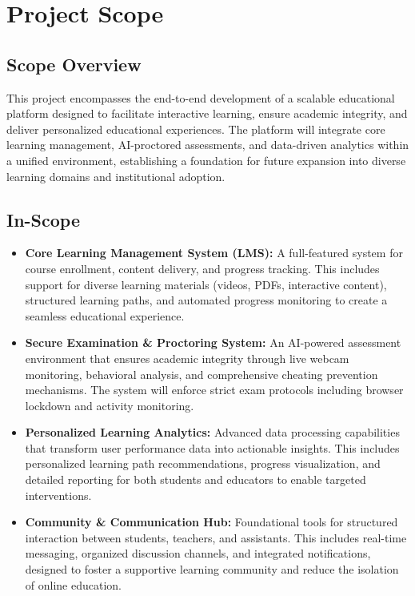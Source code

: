 \section{Project Scope}
\label{sec:project_scope}

\subsection{Scope Overview}
\label{subsec:scope_overview}
This project encompasses the end-to-end development of a scalable educational platform designed to facilitate interactive learning, ensure academic integrity, and deliver personalized educational experiences. The platform will integrate core learning management, AI-proctored assessments, and data-driven analytics within a unified environment, establishing a foundation for future expansion into diverse learning domains and institutional adoption.

\subsection{In-Scope}
\label{subsec:in_scope}
\begin{itemize}
    \item \textbf{Core Learning Management System (LMS):} A full-featured system for course enrollment, content delivery, and progress tracking. This includes support for diverse learning materials (videos, PDFs, interactive content), structured learning paths, and automated progress monitoring to create a seamless educational experience.
    \item \textbf{Secure Examination \& Proctoring System:} An AI-powered assessment environment that ensures academic integrity through live webcam monitoring, behavioral analysis, and comprehensive cheating prevention mechanisms. The system will enforce strict exam protocols including browser lockdown and activity monitoring.
    \item \textbf{Personalized Learning Analytics:} Advanced data processing capabilities that transform user performance data into actionable insights. This includes personalized learning path recommendations, progress visualization, and detailed reporting for both students and educators to enable targeted interventions.
    \item \textbf{Community \& Communication Hub:} Foundational tools for structured interaction between students, teachers, and assistants. This includes real-time messaging, organized discussion channels, and integrated notifications, designed to foster a supportive learning community and reduce the isolation of online education.
\end{itemize}

